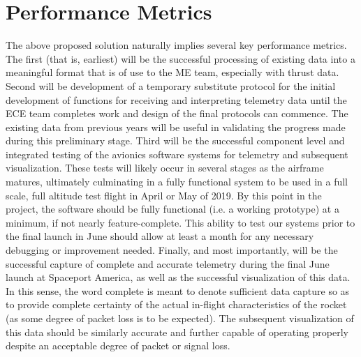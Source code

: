 \documentclass[onecolumn, draftclsnofoot,10pt, compsoc]{IEEEtran}
\begin{document}
\section{Performance Metrics}

The above proposed solution naturally implies several key performance metrics.
The first (that is, earliest) will be the successful processing of existing data into a meaningful format that is of use to the ME team, especially with thrust data.
Second will be development of a temporary substitute protocol for the initial development of functions for receiving and interpreting telemetry data until the ECE team completes work and design of the final protocols can commence.
The existing data from previous years will be useful in validating the progress made during this preliminary stage.
Third will be the successful component level and integrated testing of the avionics software systems for telemetry and subsequent visualization. 
These tests will likely occur in several stages as the airframe matures, ultimately culminating in a fully functional system to be used in a full scale, full altitude test flight in April or May of 2019.
By this point in the project, the software should be fully functional (i.e. a working prototype) at a minimum, if not nearly feature-complete.
This ability to test our systems prior to the final launch in June should allow at least a month for any necessary debugging or improvement needed.
Finally, and most importantly, will be the successful capture of complete and accurate telemetry during the final June launch at Spaceport America, as well as the successful visualization of this data.
In this sense, the word complete is meant to denote sufficient data capture so as to provide complete certainty of the actual in-flight characteristics of the rocket (as some degree of packet loss is to be expected).
The subsequent visualization of this data should be similarly accurate and further capable of operating properly despite an acceptable degree of packet or signal loss.
\end{document}
